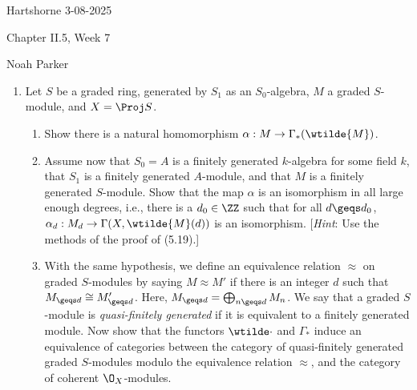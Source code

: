 \documentclass[12pt]{amsart}
\begin{document}
{Hartshorne} \hfill {3-08-2025}

\bigskip\bigskip

\begin{center}

{\sc Chapter II.5, Week 7}

\end{center}

\begin{center}

  {Noah Parker} %
    
\end{center}

\bigskip\bigskip

\begin{enumerate}
  \item[5.9.] {
      Let $S$ be a graded ring, generated by $S_1$ as an $S_0$-algebra, $M$ a graded $S$-module, and $X=\Proj S$.
      \begin{enumerate}
        \item Show there is a natural homomorphism $\alpha:M\to \Gamma_*(\wtilde{M})$.
        \item Assume now that $S_0=A$ is a finitely generated $k$-algebra for some field $k$, that $S_1$ is a finitely generated $A$-module, and that $M$ is a finitely generated $S$-module.
          Show that the map $\alpha$ is an isomorphism in all large enough degrees, i.e., there is a $d_0\in \ZZ$ such that for all $d\geqs d_0$, $\alpha_d:M_d\to \Gamma(X,\wtilde{M}(d))$ is an isomorphism.
          [\emph{Hint}: Use the methods of the proof of (5.19).]
        \item With the same hypothesis, we define an equivalence relation $\approx$ on graded $S$-modules by saying $M\approx M'$ if there is an integer $d$ such that $M_{\geqs d}\cong M_{\geqs d}'$.
          Here, $M_{\geqs d}=\bigoplus_{n\geqs d}M_n$.
          We say that a graded $S$-module is \emph{quasi-finitely generated} if it is equivalent to a finitely generated module.
          Now show that the functors $\wtilde\cdot$ and $\Gamma_*$ induce an equivalence of categories between the category of quasi-finitely generated graded $S$-modules modulo the equivalence relation $\approx$, and the category of coherent $\O_X$-modules.
      \end{enumerate}
    }
\end{enumerate}
\end{document}
